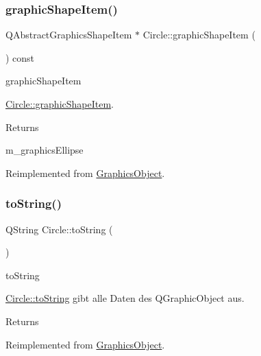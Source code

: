 \subsubsection{\texorpdfstring{graphic\+Shape\+Item()}{graphicShapeItem()}}
{\footnotesize\ttfamily Q\+Abstract\+Graphics\+Shape\+Item $\ast$ Circle\+::graphic\+Shape\+Item (\begin{DoxyParamCaption}{ }\end{DoxyParamCaption}) const\hspace{0.3cm}{\ttfamily [virtual]}}



graphic\+Shape\+Item 

\hyperlink{class_circle_a2c6dda8b50d9e19448d2e328b74430ce}{Circle\+::graphic\+Shape\+Item}.

\begin{DoxyReturn}{Returns}


m\+\_\+graphics\+Ellipse 
\end{DoxyReturn}


Reimplemented from \hyperlink{class_graphics_object_ad898be2fdbcc4c57f908cdd6a3feaa44}{Graphics\+Object}.

\mbox{\label{class_circle_a2fea55f4310daa23eb8c103bdcdcabd6}} 
\subsubsection{\texorpdfstring{to\+String()}{toString()}}
{\footnotesize\ttfamily Q\+String Circle\+::to\+String (\begin{DoxyParamCaption}{ }\end{DoxyParamCaption})\hspace{0.3cm}{\ttfamily [virtual]}}



to\+String 

\hyperlink{class_circle_a2fea55f4310daa23eb8c103bdcdcabd6}{Circle\+::to\+String} gibt alle Daten des Q\+Graphic\+Object aus.

\begin{DoxyReturn}{Returns}

\end{DoxyReturn}


Reimplemented from \hyperlink{class_graphics_object_ad985316df1516a5a7311161250b5e233}{Graphics\+Object}.



